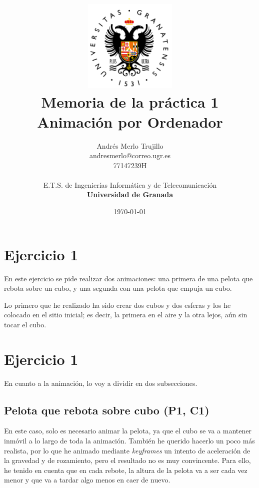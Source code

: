 \documentclass{article}
\title{
\includegraphics[width=1.75in]{imagenes/UGR-Logo.png} \\
\vspace*{1in}
\textbf{Memoria de la práctica 1} \\
Animación por Ordenador \\
\vspace*{0.5in}}
\author{Andrés Merlo Trujillo \\
andresmerlo@correo.ugr.es \\
77147239H \\ 
\vspace*{0.5in} \\
E.T.S. de Ingenierías Informática y de Telecomunicación \\
\textbf{Universidad de Granada}} \date{\today}
\begin{document}
\begin{titlingpage}
\maketitle
\end{titlingpage}

\tableofcontents

\newpage

\pagestyle{fancy}   %

\section{Ejercicio 1}

En este ejercicio se pide realizar dos animaciones: una primera de una pelota que rebota sobre un cubo, y una segunda con una pelota que empuja un cubo.

\bigskip


Lo primero que he realizado ha sido crear dos cubos y dos esferas y los he colocado en el sitio inicial; es decir, la primera en el aire y la otra lejos, aún sin tocar el cubo.


\section{Ejercicio 1}
En cuanto a la animación, lo voy a dividir en dos subsecciones.

\subsection{Pelota que rebota sobre cubo (P1, C1)}

En este caso, solo es necesario animar la pelota, ya que el cubo se va a mantener inmóvil a lo largo de toda la animación. También he querido hacerlo un poco más realista, por lo que he animado mediante \textit{keyframes} un intento de aceleración de la gravedad y de rozamiento, pero el resultado no es muy convincente. Para ello, he tenido en cuenta que en cada rebote, la altura de la pelota va a ser cada vez menor y que va a tardar algo menos en caer de nuevo. 
\end{document}
